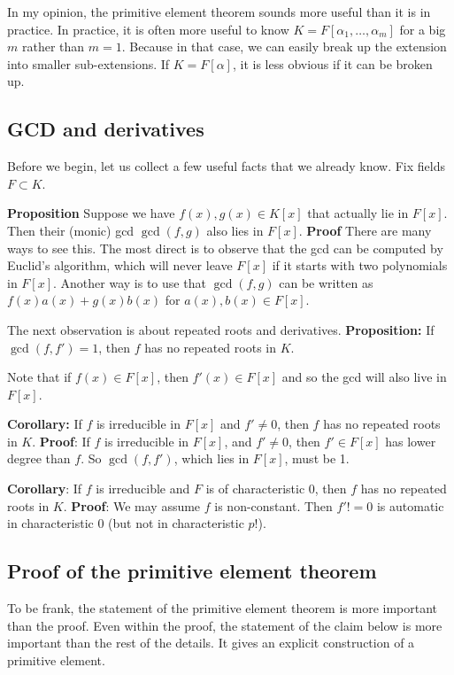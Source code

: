 \documentclass[11pt]{article}
\begin{document}
In my opinion, the primitive element theorem sounds more useful than it is in practice.
In practice, it is often more useful to know \(K = F[\alpha_1, \dots, \alpha_m]\) for a big \(m\) rather than \(m = 1\).
Because in that case, we can easily break up the extension into smaller sub-extensions. 
If \(K = F[\alpha]\), it is less obvious if it can be broken up.
\subsection{GCD and derivatives}
\label{sec:org8d897d6}
Before we begin, let us collect a few useful facts that we already know.
Fix fields \(F \subset K\).

\textbf{\textbf{Proposition}} Suppose we have \(f(x), g(x) \in K[x]\) that actually lie in \(F[x]\).
Then their (monic) gcd \(\gcd(f,g)\) also lies in \(F[x]\).
\textbf{\textbf{Proof}} There are many ways to see this.  The most direct is to observe that the gcd can be computed by Euclid's algorithm, which will never leave \(F[x]\) if it starts with two polynomials in \(F[x]\).
Another way is to use that \(\gcd(f,g)\) can be written as \(f(x) a(x) + g(x) b(x)\) for \(a(x), b(x) \in F[x]\).

The next observation is about repeated roots and derivatives.
\textbf{\textbf{Proposition:}} If \(\gcd(f, f') = 1\), then \(f\) has no repeated roots in \(K\).

Note that if \(f(x) \in F[x]\), then \(f'(x) \in F[x]\) and so the gcd will also live in \(F[x]\).

\textbf{\textbf{Corollary:}} If \(f\) is irreducible in \(F[x]\) and \(f' \neq 0\), then \(f\) has no repeated roots in \(K\).
\textbf{\textbf{Proof}}: If \(f\) is irreducible in \(F[x]\), and \(f' \neq 0\), then \(f' \in F[x]\) has lower degree than \(f\).
So \(\gcd(f,f')\), which lies in \(F[x]\), must be 1.

\textbf{\textbf{Corollary}}: If \(f\) is irreducible and \(F\) is of characteristic 0, then \(f\) has no repeated roots in \(K\).
\textbf{\textbf{Proof}}: We may assume \(f\) is non-constant.  Then \(f' != 0\) is automatic in characteristic 0 (but not in characteristic \(p\)!).
\subsection{Proof of the primitive element theorem}
\label{sec:org9ceee57}
To be frank, the statement of the primitive element theorem is more important than the proof.
Even within the proof, the statement of the claim below is more important than the rest of the details.
It gives an explicit construction of a primitive element.
\end{document}
